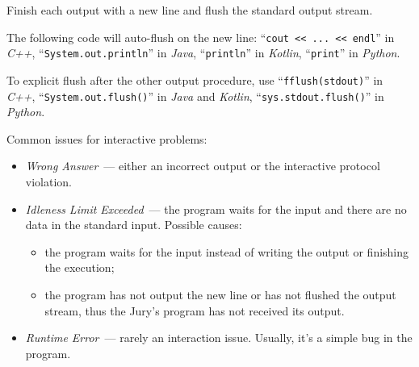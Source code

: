 
Finish each output with a new line and flush the standard output stream. 

The following code will auto-flush on the new line:
``\texttt{cout <\relax< ... <\relax< endl}'' in \emph{C++},
``\texttt{System.out.println}'' in \emph{Java}, 
``\texttt{println}'' in \emph{Kotlin}, 
``\texttt{print}'' in \emph{Python}.

To explicit flush after the other output procedure, use
``\texttt{fflush(stdout)}'' in \emph{C++}, 
``\texttt{System.out.flush()}'' in \emph{Java} and \emph{Kotlin}, 
``\texttt{sys.stdout.flush()}'' in \emph{Python}.

Common issues for interactive problems:
\begin{itemize}
    \item \emph{Wrong Answer}~--- 
        either an incorrect output or the interactive protocol violation.
    \item \emph{Idleness Limit Exceeded}~---
        the program waits for the input and there are no data in the standard input.
        Possible causes:
        \begin{itemize}
            \item the program waits for the input instead of writing the output 
                or finishing the execution;
            \item the program has not output the new line or has not flushed 
                the output stream, 
                thus the Jury's program has not received its output.
        \end{itemize}
    \item \emph{Runtime Error}~--- rarely an interaction issue. 
        Usually, it's a simple bug in the program.
\end{itemize}
